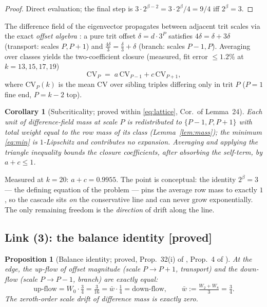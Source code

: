 \documentclass[11pt]{article}
\newtheorem{proposition}[theorem]{Proposition}
\newtheorem{corollary}[theorem]{Corollary}
\theoremstyle{definition}
\theoremstyle{remark}
\newcommand{\CV}{\mathrm{CV}}
\newcommand{\bet}{\beta}
\begin{document}
\begin{proof}
Direct evaluation; the final step is
$3 \cdot 2^{\bet-2} = 3 \cdot 2^{\bet}/4 = 9/4$ iff $2^{\bet} = 3$.
\end{proof}

The difference field of the eigenvector propagates between adjacent trit scales
via the exact \emph{offset algebra} \cite{Temp26,Drift26}: a pure trit offset
$\delta = d \cdot 3^P$ satisfies $4\delta = \delta + 3\delta$ (transport:
scales $P, P{+}1$) and $\tfrac{4\delta}{3} = \tfrac{\delta}{3} + \delta$
(branch: scales $P{-}1, P$). Averaging over classes yields the two-coefficient
closure (measured, fit error $\leq 1.2\%$ at $k = 13, 15, 17, 19$)
\begin{equation}
\CV_P \;=\; a\, \CV_{P-1} + c\, \CV_{P+1},
\label{eq:lattice}
\end{equation}
where $\CV_P(k)$ is the mean $\CV$ over sibling triples differing only in trit
$P$ ($P = 1$ fine end, $P = k-2$ top).

\begin{corollary}[Subcriticality; proved within \eqref{eq:lattice}, Cor.\ of
Lemma~24]\label{cor:subcrit}
Each unit of difference-field mass at scale $P$ is redistributed to
$\{P-1, P, P+1\}$ with total weight equal to the row mass of its class
(Lemma~\ref{lem:mass}); the minimum \eqref{eq:min} is $1$-Lipschitz and
contributes no expansion. Averaging and applying the triangle inequality bounds
the closure coefficients, after absorbing the self-term, by
$a + c \leq 1$.
\end{corollary}

Measured at $k = 20$: $a + c = 0.9955$. The point is conceptual: the identity
$2^{\bet} = 3$ --- the defining equation of the problem --- pins the average row
mass to exactly $1$, so the cascade sits \emph{on} the conservative line and can
never grow exponentially. The only remaining freedom is the \emph{direction} of
drift along the line.

\subsection{Link (3): the balance identity
\textnormal{[proved]}}
\label{sec:link3}

\begin{proposition}[Balance identity; proved, Prop.~32(i) of \cite{NOTE},
Prop.~4 of \cite{Drift26}]\label{prop:balance}
At the edge, the up-flow of offset magnitude (scale $P \to P+1$, transport) and
the down-flow (scale $P \to P-1$, branch) are exactly equal:
\[
\text{up-flow} = W_0 \cdot \tfrac34 = \tfrac{3}{16}
= \bar w \cdot \tfrac14 = \text{down-flow},
\qquad \bar w := \tfrac{W_2 + W_8}{3} = \tfrac34 .
\]
The zeroth-order scale drift of difference mass is exactly zero.
\end{proposition}
\end{document}
